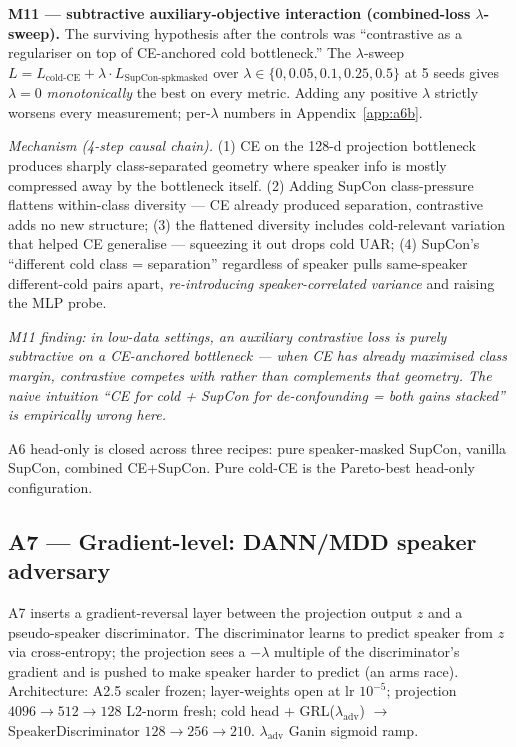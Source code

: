 \textbf{M11 --- subtractive auxiliary-objective interaction (combined-loss $\lambda$-sweep).} The surviving hypothesis after the controls was ``contrastive as a regulariser on top of CE-anchored cold bottleneck.'' The $\lambda$-sweep $L = L_{\text{cold-CE}} + \lambda \cdot L_{\text{SupCon-spkmasked}}$ over $\lambda \in \{0, 0.05, 0.1, 0.25, 0.5\}$ at 5 seeds gives $\lambda{=}0$ \emph{monotonically} the best on every metric. Adding any positive $\lambda$ strictly worsens every measurement; per-$\lambda$ numbers in Appendix~\ref{app:a6b}.

\textit{Mechanism (4-step causal chain).} (1) CE on the 128-d projection bottleneck produces sharply class-separated geometry where speaker info is mostly compressed away by the bottleneck itself. (2) Adding SupCon class-pressure flattens within-class diversity --- CE already produced separation, contrastive adds no new structure; (3) the flattened diversity includes cold-relevant variation that helped CE generalise --- squeezing it out drops cold UAR; (4) SupCon's ``different cold class = separation'' regardless of speaker pulls same-speaker different-cold pairs apart, \emph{re-introducing speaker-correlated variance} and raising the MLP probe.

\textit{M11 finding:} \emph{in low-data settings, an auxiliary contrastive loss is purely subtractive on a CE-anchored bottleneck --- when CE has already maximised class margin, contrastive competes with rather than complements that geometry. The naive intuition ``CE for cold + SupCon for de-confounding = both gains stacked'' is empirically wrong here.}

A6 head-only is closed across three recipes: pure speaker-masked SupCon, vanilla SupCon, combined CE+SupCon. Pure cold-CE is the Pareto-best head-only configuration.

\subsection{A7 — Gradient-level: DANN/MDD speaker adversary}
\label{ssec:a7}

A7 inserts a gradient-reversal layer between the projection output $z$ and a pseudo-speaker discriminator. The discriminator learns to predict speaker from $z$ via cross-entropy; the projection sees a $-\lambda$ multiple of the discriminator's gradient and is pushed to make speaker harder to predict (an arms race). Architecture: A2.5 scaler frozen; layer-weights open at lr $10^{-5}$; projection $4096 \to 512 \to 128$ L2-norm fresh; cold head + GRL($\lambda_{\text{adv}}$) $\to$ SpeakerDiscriminator $128 \to 256 \to 210$. $\lambda_{\text{adv}}$ Ganin sigmoid ramp.

